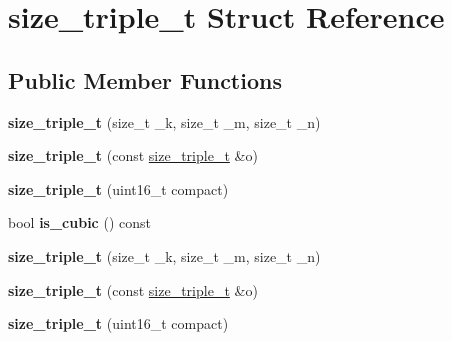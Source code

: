 \hypertarget{structsize__triple__t}{}\section{size\+\_\+triple\+\_\+t Struct Reference}
\label{structsize__triple__t}
\subsection*{Public Member Functions}
\begin{DoxyCompactItemize}
\item 
\mbox{\label{structsize__triple__t_aeb3b790550c56b92d5b13acd87ea04e2}} 
{\bfseries size\+\_\+triple\+\_\+t} (size\+\_\+t \+\_\+k, size\+\_\+t \+\_\+m, size\+\_\+t \+\_\+n)
\item 
\mbox{\label{structsize__triple__t_a0e96c9188a766d1c4fd5cfc5cf6dc7a7}} 
{\bfseries size\+\_\+triple\+\_\+t} (const \hyperlink{structsize__triple__t}{size\+\_\+triple\+\_\+t} \&o)
\item 
\mbox{\label{structsize__triple__t_af10cc6003ebfaebb5b4cad99f022e857}} 
{\bfseries size\+\_\+triple\+\_\+t} (uint16\+\_\+t compact)
\item 
\mbox{\label{structsize__triple__t_a5d1fd357cb1c070f864bbf7713337c64}} 
bool {\bfseries is\+\_\+cubic} () const
\item 
\mbox{\label{structsize__triple__t_aeb3b790550c56b92d5b13acd87ea04e2}} 
{\bfseries size\+\_\+triple\+\_\+t} (size\+\_\+t \+\_\+k, size\+\_\+t \+\_\+m, size\+\_\+t \+\_\+n)
\item 
\mbox{\label{structsize__triple__t_a0e96c9188a766d1c4fd5cfc5cf6dc7a7}} 
{\bfseries size\+\_\+triple\+\_\+t} (const \hyperlink{structsize__triple__t}{size\+\_\+triple\+\_\+t} \&o)
\item 
\mbox{\label{structsize__triple__t_af10cc6003ebfaebb5b4cad99f022e857}} 
{\bfseries size\+\_\+triple\+\_\+t} (uint16\+\_\+t compact)
\item 
\mbox{\label{structsize__triple__t_aeb3b790550c56b92d5b13acd87ea04e2}} 

\end{DoxyCompactItemize}

